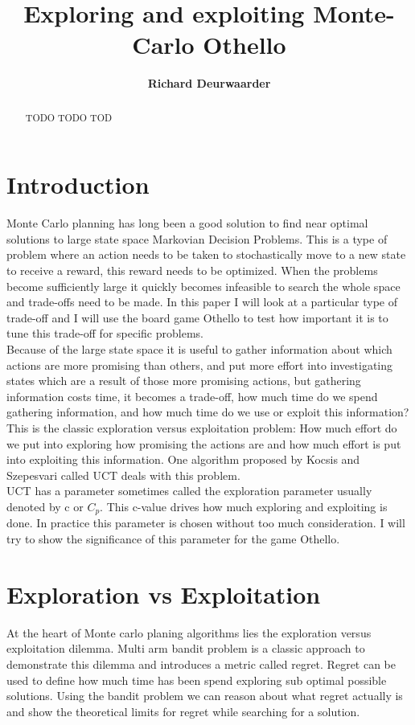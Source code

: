 \documentclass[10pt,letterpaper]{article}
\title{Exploring and exploiting Monte-Carlo Othello}
\author{\large \bf Richard Deurwaarder}
\begin{document}
\maketitle

\begin{abstract}
TODO TODO TOD
\end{abstract}

\section{Introduction}
Monte Carlo planning has long been a good solution to find near optimal solutions to large state space Markovian Decision Problems. This is a type of problem where an action needs to be taken to stochastically move to a new state to receive a reward, this reward needs to be optimized. When the problems become sufficiently large it quickly becomes infeasible to search the whole space and trade-offs need to be made. In this paper I will look at a particular type of trade-off and I will use the board game Othello to test how important it is to tune this trade-off for specific problems.\\

Because of the large state space it is useful to gather information about which actions are more promising than others, and put more effort into investigating states which are a result of those more promising actions, but gathering information costs time, it becomes a trade-off, how much time do we spend gathering information, and how much time do we use or exploit this information? This is the classic exploration versus exploitation problem: How much effort do we put into exploring how promising the actions are and how much effort is put into exploiting this information. One algorithm proposed by Kocsis and Szepesvari\cite{Kocsis:2006} called UCT deals with this problem.\\

UCT has a parameter sometimes called the exploration parameter usually denoted by c or $C_p$. This c-value drives how much exploring and exploiting is done. In practice this parameter is chosen without too much consideration. I will try to show the significance of this parameter for the game Othello.

\section{Exploration vs Exploitation}
At the heart of Monte carlo planing algorithms lies the exploration versus exploitation dilemma. Multi arm bandit problem is a classic approach to demonstrate this dilemma and introduces a metric called regret. Regret can be used to define how much time has been spend exploring sub optimal possible solutions. Using the bandit problem we can reason about what regret actually is and show the theoretical limits for regret while searching for a solution.
\end{document}
